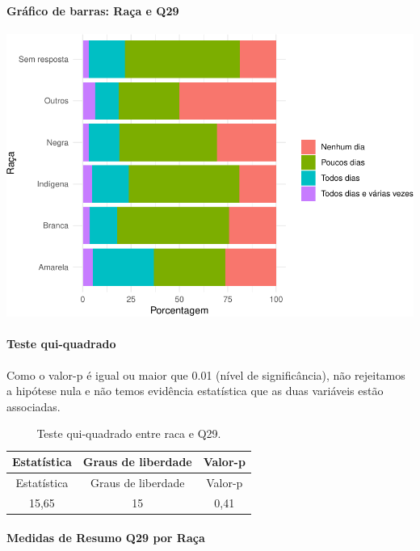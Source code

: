 \documentclass[]{article}
\let\oldparagraph\paragraph
\renewcommand{\paragraph}[1]{\oldparagraph{#1}\mbox{}}
\begin{document}
\hypertarget{gruxe1fico-de-barras-rauxe7a-e-q29}{%
\paragraph{Gráfico de barras: Raça e Q29}\label{gruxe1fico-de-barras-rauxe7a-e-q29}}

\begin{center}\includegraphics[width=0.75\linewidth]{relatorio_covid19_files/figure-latex/unnamed-chunk-929-1} \end{center}

\hypertarget{teste-qui-quadrado-80}{%
\paragraph{Teste qui-quadrado}\label{teste-qui-quadrado-80}}

Como o valor-p é igual ou maior que 0.01 (nível de significância), não rejeitamos a hipótese nula e não temos evidência estatística que as duas variáveis estão associadas.

\begin{longtable}[]{@{}ccc@{}}
\caption{\label{tab:unnamed-chunk-931}Teste qui-quadrado entre raca e Q29.}\tabularnewline
\toprule
Estatística & Graus de liberdade & Valor-p\tabularnewline
\midrule
\endfirsthead
\toprule
Estatística & Graus de liberdade & Valor-p\tabularnewline
\midrule
\endhead
15,65 & 15 & 0,41\tabularnewline
\bottomrule
\end{longtable}

\cleardoublepage

\hypertarget{medidas-de-resumo-q29-por-rauxe7a}{%
\paragraph{Medidas de Resumo Q29 por Raça}\label{medidas-de-resumo-q29-por-rauxe7a}}
\end{document}
